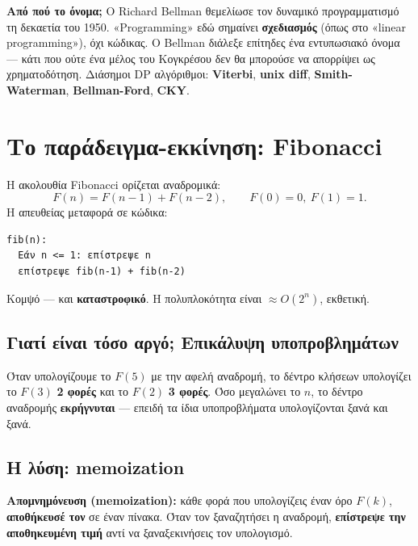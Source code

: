 \documentclass[11pt,a4paper]{article}
\begin{document}
\begin{notebox}
\textbf{Από πού το όνομα;} Ο Richard Bellman θεμελίωσε τον δυναμικό
προγραμματισμό τη δεκαετία του 1950. «Programming» εδώ σημαίνει
\textbf{σχεδιασμός} (όπως στο «linear programming»), όχι κώδικας. Ο Bellman
διάλεξε επίτηδες ένα εντυπωσιακό όνομα --- κάτι που ούτε ένα μέλος του
Κογκρέσου δεν θα μπορούσε να απορρίψει ως χρηματοδότηση. Διάσημοι DP αλγόριθμοι:
\textbf{Viterbi}, \textbf{unix diff}, \textbf{Smith-Waterman},
\textbf{Bellman-Ford}, \textbf{CKY}.
\end{notebox}

\section{Το παράδειγμα-εκκίνηση: Fibonacci}

Η ακολουθία Fibonacci ορίζεται αναδρομικά:
\[
F(n) = F(n-1) + F(n-2), \qquad F(0) = 0,\ F(1) = 1.
\]
Η απευθείας μεταφορά σε κώδικα:

\begin{codebox}
\begin{verbatim}
fib(n):
  Εάν n <= 1: επίστρεψε n
  επίστρεψε fib(n-1) + fib(n-2)
\end{verbatim}
\end{codebox}

Κομψό --- και \textbf{καταστροφικό}. Η πολυπλοκότητα είναι $\approx O(2^n)$,
εκθετική.

\subsection{Γιατί είναι τόσο αργό; Επικάλυψη υποπροβλημάτων}

Όταν υπολογίζουμε το $F(5)$ με την αφελή αναδρομή, το δέντρο κλήσεων υπολογίζει
το $F(3)$ \textbf{2 φορές} και το $F(2)$ \textbf{3 φορές}. Όσο μεγαλώνει το $n$,
το δέντρο αναδρομής \textbf{εκρήγνυται} --- επειδή τα ίδια υποπροβλήματα
υπολογίζονται ξανά και ξανά.

\subsection{Η λύση: memoization}

\begin{keypoint}
\textbf{Απομνημόνευση (memoization):} κάθε φορά που υπολογίζεις έναν όρο $F(k)$,
\textbf{αποθήκευσέ τον} σε έναν πίνακα. Όταν τον ξαναζητήσει η αναδρομή,
\textbf{επίστρεψε την αποθηκευμένη τιμή} αντί να ξαναξεκινήσεις τον υπολογισμό.
\end{keypoint}
\end{document}

